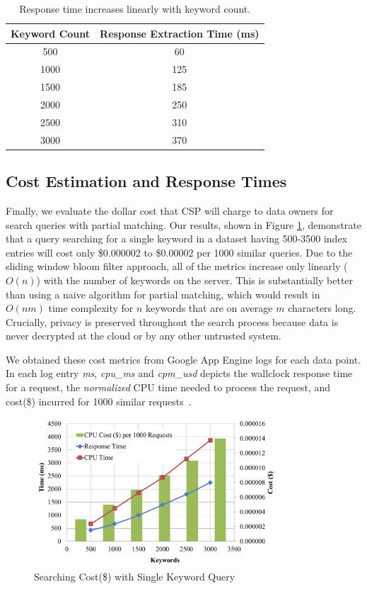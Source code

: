 \begin{table}[th!]
\centering
\caption{Response time increases linearly with keyword count.}
\label{tab:search_response_time}
\begin{tabular}{| c | c | }
\hline
Keyword Count & Response Extraction Time (ms) \\
\hline
500  &  60 \\
1000 &  125 \\
1500 &  185 \\
2000 &  250 \\
2500 &  310 \\
3000 &  370 \\
\hline
\end{tabular}


\end{table}


\subsection{Cost Estimation and Response Times}

Finally, we evaluate the dollar cost that CSP will charge to data owners for search
queries with partial matching. 
Our results, shown in Figure \ref{fig:cost_single_query}, demonstrate that a query
searching for a single keyword in a dataset having 500-3500 index entries will cost only 
\$0.000002 to \$0.00002 per 1000 similar
queries. Due to the sliding window bloom filter approach, 
all of the metrics increase only linearly ($O(n)$) with the number
of keywords on the server. This is substantially better than using a naive algorithm 
for partial matching, which would result in $O(nm)$ time complexity 
for $n$ keywords that are on average $m$ characters long. Crucially,
privacy is preserved throughout the search process because data is never
decrypted at the cloud or by any other untrusted system.

We obtained these cost metrics from Google App Engine logs for each data point. In
each log entry \emph{ms}, \emph{cpu\_ms} and \emph{cpm\_usd} depicts the wallclock response
time for a request, the \emph{normalized} CPU time needed to process the
request, and cost(\$) incurred for 1000 similar requests~\cite{google_cloud_logs}.


\begin{figure}
  \centering
  \includegraphics[width= 3.6in]{figures/cost_keywords_graph.png}
  \caption{Searching Cost(\$) with Single Keyword Query}
  \label{fig:cost_single_query}
\end{figure}
